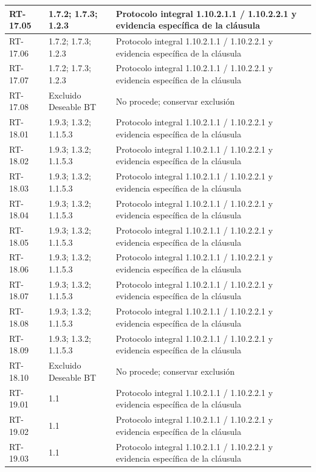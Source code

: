 \begin{longtable}{L{23mm}L{46mm}L{72mm}}
RT-17.05 & 1.7.2; 1.7.3; 1.2.3 & Protocolo integral 1.10.2.1.1 / 1.10.2.2.1 y evidencia específica de la cláusula\\\hline
RT-17.06 & 1.7.2; 1.7.3; 1.2.3 & Protocolo integral 1.10.2.1.1 / 1.10.2.2.1 y evidencia específica de la cláusula\\\hline
RT-17.07 & 1.7.2; 1.7.3; 1.2.3 & Protocolo integral 1.10.2.1.1 / 1.10.2.2.1 y evidencia específica de la cláusula\\\hline
RT-17.08 & Excluido Deseable BT & No procede; conservar exclusión\\\hline
RT-18.01 & 1.9.3; 1.3.2; 1.1.5.3 & Protocolo integral 1.10.2.1.1 / 1.10.2.2.1 y evidencia específica de la cláusula\\\hline
RT-18.02 & 1.9.3; 1.3.2; 1.1.5.3 & Protocolo integral 1.10.2.1.1 / 1.10.2.2.1 y evidencia específica de la cláusula\\\hline
RT-18.03 & 1.9.3; 1.3.2; 1.1.5.3 & Protocolo integral 1.10.2.1.1 / 1.10.2.2.1 y evidencia específica de la cláusula\\\hline
RT-18.04 & 1.9.3; 1.3.2; 1.1.5.3 & Protocolo integral 1.10.2.1.1 / 1.10.2.2.1 y evidencia específica de la cláusula\\\hline
RT-18.05 & 1.9.3; 1.3.2; 1.1.5.3 & Protocolo integral 1.10.2.1.1 / 1.10.2.2.1 y evidencia específica de la cláusula\\\hline
RT-18.06 & 1.9.3; 1.3.2; 1.1.5.3 & Protocolo integral 1.10.2.1.1 / 1.10.2.2.1 y evidencia específica de la cláusula\\\hline
RT-18.07 & 1.9.3; 1.3.2; 1.1.5.3 & Protocolo integral 1.10.2.1.1 / 1.10.2.2.1 y evidencia específica de la cláusula\\\hline
RT-18.08 & 1.9.3; 1.3.2; 1.1.5.3 & Protocolo integral 1.10.2.1.1 / 1.10.2.2.1 y evidencia específica de la cláusula\\\hline
RT-18.09 & 1.9.3; 1.3.2; 1.1.5.3 & Protocolo integral 1.10.2.1.1 / 1.10.2.2.1 y evidencia específica de la cláusula\\\hline
RT-18.10 & Excluido Deseable BT & No procede; conservar exclusión\\\hline
RT-19.01 & 1.1 & Protocolo integral 1.10.2.1.1 / 1.10.2.2.1 y evidencia específica de la cláusula\\\hline
RT-19.02 & 1.1 & Protocolo integral 1.10.2.1.1 / 1.10.2.2.1 y evidencia específica de la cláusula\\\hline
RT-19.03 & 1.1 & Protocolo integral 1.10.2.1.1 / 1.10.2.2.1 y evidencia específica de la cláusula\\\hline

\end{longtable}
